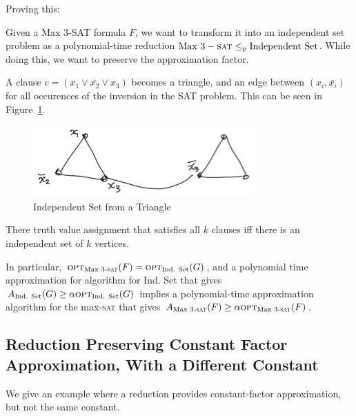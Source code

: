                    Proving this:

                    Given a Max 3-SAT formula $F$, we want to transform it into an independent set problem as a polynomial-time reduction $\text{Max } 3-\textsc{sat} \le_p \text{Independent Set}$.
                    While doing this, we want to preserve the approximation factor.

                    A clause $c = (x_1 \lor \bar{x_2} \lor x_3)$ becomes a triangle, and an edge between $(x_i, \bar{x_i})$ for all occurences of the inversion in the SAT problem.
                    This can be seen in Figure~\ref{fig:indep_set_traingle}.

                    \begin{figure}[h]
                        \centering
                        \includegraphics{images/indep_set_traingle.png}
                        \caption{Independent Set from a Triangle}
                        \label{fig:indep_set_traingle}
                    \end{figure}

                    There truth value assignment that satisfies all $k$ clauses iff there is an independent set of $k$ vertices.

                    In particular, $\textsc{opt}_\text{Max 3-\textsc{sat}}(F) = \textsc{opt}_\text{Ind. Set} (G)$, and a polynomial time approximation for algorithm for Ind. Set that gives $A_\text{Ind. Set}(G) \ge \alpha \textsc{opt}_\text{Ind. Set}(G)$ implies a polynomial-time approximation algorithm for the max-\textsc{sat} that gives $A_\text{Max 3-\textsc{sat}}(F) \ge \alpha \textsc{opt}_\text{Max 3-\textsc{sat}}(F)$.
                \subsection{Reduction Preserving Constant Factor Approximation, With a Different Constant} %
                \label{sub:reduction_preserving_constant_factor_approximation_with_a_different_constant}
                    We give an example where a reduction provides constant-factor approximation, but not the same constant.

